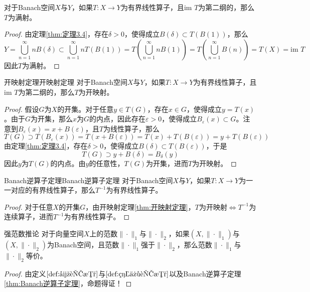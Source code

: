 \documentclass[lang = cn, scheme = chinese, thmcnt = section]{elegantbook}
\newcommand{\sub}{\subset}             %
\newcommand{\im}{\text{im }}           %
\begin{document}
\begin{corollary}
	对于Banach空间$X$与$Y$，如果$T:X\to Y$为有界线性算子，且$\im T$为第二纲的，那么$T$为满射。
\end{corollary}

\begin{proof}
	由定理\ref{thm:定理3.4}，存在$\delta>0$，使得成立$B(\delta)\sub T(B(1))$，那么
	$$
	Y=\bigcup_{n=1}^{\infty}nB(\delta)
	\subset \bigcup_{n=1}^{\infty}nT(B(1))
	=T\left( \bigcup_{n=1}^{\infty}nB(1) \right)
	=T\left( \bigcup_{n=1}^{\infty}B(n) \right)
	=T(X)
	=\im T
	$$
	因此$T$为满射。
\end{proof}

\begin{theorem}{开映射定理}{开映射定理}
	对于Banach空间$X$与$Y$，如果$T:X\to Y$为有界线性算子，且$\im T$为第二纲的，那么$T$为开映射。
\end{theorem}

\begin{proof}
	假设$G$为$X$的开集。对于任意$y\in T(G)$，存在$x\in G$，使得成立$y=T(x)$。由于$G$为开集，那么$x$为$G$的内点，因此存在$\varepsilon>0$，使得成立$B_\varepsilon(x)\sub G$。注意到$B_\varepsilon(x)=x+B(\varepsilon)$，且$T$为线性算子，那么
	$$
	T(G)\supset T(B_\varepsilon(x))=T(x+B(\varepsilon))=T(x)+T(B(\varepsilon))=y+T(B(\varepsilon))
	$$
	由定理\ref{thm:定理3.4}，存在$\delta>0$，使得成立$B(\delta)\sub T(B(\varepsilon))$，于是
	$$
	T(G)\supset y+B(\delta)=B_{\delta}(y)
	$$
	因此$y$为$T(G)$的内点。由$y$的任意性，$T(G)$为开集，进而$T$为开映射。
\end{proof}

\begin{theorem}{Banach逆算子定理}{Banach逆算子定理}
	对于Banach空间$X$与$Y$，如果$T:X\to Y$为一一对应的有界线性算子，那么$T^{-1}$为有界线性算子。
\end{theorem}

\begin{proof}
	对于任意$X$的开集$G$，由开映射定理\ref{thm:开映射定理}，$T$为开映射$\iff T^{-1}$为连续算子，进而$T^{-1}$为有界线性算子。
\end{proof}

\begin{corollary}{}{强范数推论}
	对于向量空间$X$上的范数$\|\cdot\|_1$与$\|\cdot\|_2$，如果$(X,\|\cdot\|_1)$与$(X,\|\cdot\|_2)$为Banach空间，且范数$\|\cdot\|_1$强于$\|\cdot\|_2$，那么范数$\|\cdot\|_1$与$\|\cdot\|_2$等价。
\end{corollary}

\begin{proof}
	由定义$\ref{def:强范数}$与$\ref{def:等价范数}$以及Banach逆算子定理\ref{thm:Banach逆算子定理}，命题得证！
\end{proof}
\end{document}
